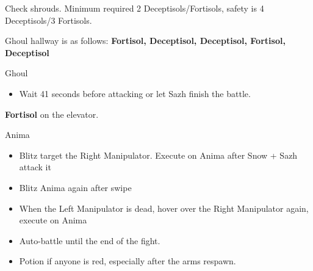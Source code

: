 \begin{paracol}{2}

	
	\switchcolumn
		Check shrouds. Minimum required 2 Deceptisols/Fortisols, safety is 4 Deceptisols/3 Fortisols.

	Ghoul hallway is as follows: {\bf Fortisol, Deceptisol, Deceptisol, Fortisol, Deceptisol}

	\begin{battle}{Ghoul}
		\begin{itemize}
			\item Wait 41 seconds before attacking or let Sazh finish the battle.
		\end{itemize}
	\end{battle}

	\textbf{Fortisol} on the elevator.

\begin{battle}{Anima}
\begin{itemize}
    \item Blitz target the Right Manipulator. Execute on Anima after Snow + Sazh attack it
    \item Blitz Anima again after swipe
    \item When the Left Manipulator is dead, hover over the Right Manipulator again, execute on Anima
    \item Auto-battle until the end of the fight.
    \item Potion if anyone is red, especially after the arms respawn.
\end{itemize}
\end{battle}



\end{paracol}


